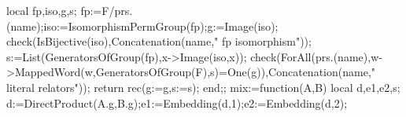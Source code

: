 \documentclass[
  10pt,
  letterpaper,
]{article}
\newenvironment{Shaded}{}{}
\newcommand{\BuiltInTok}[1]{\textcolor[rgb]{0.00,0.50,0.00}{#1}}
\newcommand{\ExtensionTok}[1]{#1}
\newcommand{\FloatTok}[1]{\textcolor[rgb]{0.25,0.63,0.44}{#1}}
\newcommand{\FunctionTok}[1]{\textcolor[rgb]{0.02,0.16,0.49}{#1}}
\newcommand{\NormalTok}[1]{#1}
\newcommand{\OperatorTok}[1]{\textcolor[rgb]{0.40,0.40,0.40}{#1}}
\newcommand{\StringTok}[1]{\textcolor[rgb]{0.25,0.44,0.63}{#1}}
\newcommand{\VariableTok}[1]{\textcolor[rgb]{0.10,0.09,0.49}{#1}}
\begin{document}
\begin{Shaded}
\begin{Highlighting}[]
 \ExtensionTok{local} \VariableTok{fp}\OperatorTok{,}\VariableTok{iso}\OperatorTok{,}\VariableTok{g}\OperatorTok{,}\VariableTok{s}\OperatorTok{;}
 \VariableTok{fp}\OperatorTok{:=}\VariableTok{F}\OperatorTok{/}\VariableTok{prs}\NormalTok{.(}\VariableTok{name}\NormalTok{)}\OperatorTok{;}\VariableTok{iso}\OperatorTok{:=}\BuiltInTok{IsomorphismPermGroup}\NormalTok{(}\VariableTok{fp}\NormalTok{)}\OperatorTok{;}\VariableTok{g}\OperatorTok{:=}\BuiltInTok{Image}\NormalTok{(}\VariableTok{iso}\NormalTok{)}\OperatorTok{;}
 \VariableTok{check}\NormalTok{(}\BuiltInTok{IsBijective}\NormalTok{(}\VariableTok{iso}\NormalTok{)}\OperatorTok{,}\BuiltInTok{Concatenation}\NormalTok{(}\VariableTok{name}\OperatorTok{,}\StringTok{" fp isomorphism"}\NormalTok{))}\OperatorTok{;}
 \VariableTok{s}\OperatorTok{:=}\BuiltInTok{List}\NormalTok{(}\BuiltInTok{GeneratorsOfGroup}\NormalTok{(}\VariableTok{fp}\NormalTok{)}\OperatorTok{,}\VariableTok{x}\OperatorTok{{-}\textgreater{}}\BuiltInTok{Image}\NormalTok{(}\VariableTok{iso}\OperatorTok{,}\VariableTok{x}\NormalTok{))}\OperatorTok{;}
 \VariableTok{check}\NormalTok{(}\BuiltInTok{ForAll}\NormalTok{(}\VariableTok{prs}\NormalTok{.(}\VariableTok{name}\NormalTok{)}\OperatorTok{,}\VariableTok{w}\OperatorTok{{-}\textgreater{}}\BuiltInTok{MappedWord}\NormalTok{(}\VariableTok{w}\OperatorTok{,}\BuiltInTok{GeneratorsOfGroup}\NormalTok{(}\VariableTok{F}\NormalTok{)}\OperatorTok{,}\VariableTok{s}\NormalTok{)}\OperatorTok{=}\BuiltInTok{One}\NormalTok{(}\VariableTok{g}\NormalTok{))}\OperatorTok{,}\BuiltInTok{Concatenation}\NormalTok{(}\VariableTok{name}\OperatorTok{,}\StringTok{" literal relators"}\NormalTok{))}\OperatorTok{;}
 \ExtensionTok{return} \ExtensionTok{rec}\NormalTok{(}\VariableTok{g}\OperatorTok{:=}\VariableTok{g}\OperatorTok{,}\VariableTok{s}\OperatorTok{:=}\VariableTok{s}\NormalTok{)}\OperatorTok{;}
\FunctionTok{end}\OperatorTok{;;}
\VariableTok{mix}\OperatorTok{:=}\FunctionTok{function}\NormalTok{(}\VariableTok{A}\OperatorTok{,}\VariableTok{B}\NormalTok{)}
 \ExtensionTok{local} \VariableTok{d}\OperatorTok{,}\VariableTok{e1}\OperatorTok{,}\VariableTok{e2}\OperatorTok{,}\VariableTok{s}\OperatorTok{;}
 \VariableTok{d}\OperatorTok{:=}\BuiltInTok{DirectProduct}\NormalTok{(}\VariableTok{A}\NormalTok{.}\VariableTok{g}\OperatorTok{,}\VariableTok{B}\NormalTok{.}\VariableTok{g}\NormalTok{)}\OperatorTok{;}\VariableTok{e1}\OperatorTok{:=}\BuiltInTok{Embedding}\NormalTok{(}\VariableTok{d}\OperatorTok{,}\FloatTok{1}\NormalTok{)}\OperatorTok{;}\VariableTok{e2}\OperatorTok{:=}\BuiltInTok{Embedding}\NormalTok{(}\VariableTok{d}\OperatorTok{,}\FloatTok{2}\NormalTok{)}\OperatorTok{;}

\end{Highlighting}
\end{Shaded}
\end{document}
